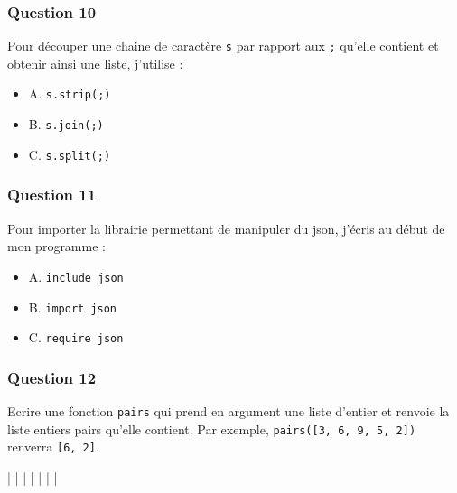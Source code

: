 \documentclass[
]{article}
\newenvironment{Shaded}{}{}
\newcommand{\OperatorTok}[1]{\textcolor[rgb]{0.40,0.40,0.40}{#1}}
\providecommand{\tightlist}{%
  \setlength{\itemsep}{0pt}\setlength{\parskip}{0pt}}
\begin{document}
\hypertarget{question-10}{%
\subsubsection{Question 10}\label{question-10}}

Pour découper une chaine de caractère \texttt{s} par rapport aux
\texttt{;} qu'elle contient et obtenir ainsi une liste, j'utilise :

\begin{itemize}
\tightlist
\item
  A. \texttt{s.strip(\textquotesingle{};\textquotesingle{})}
\item
  B. \texttt{s.join(\textquotesingle{};\textquotesingle{})}
\item
  C. \texttt{s.split(\textquotesingle{};\textquotesingle{})}
\end{itemize}

\hypertarget{question-11}{%
\subsubsection{Question 11}\label{question-11}}

Pour importer la librairie permettant de manipuler du json, j'écris au
début de mon programme :

\begin{itemize}
\tightlist
\item
  A. \texttt{include\ json}
\item
  B. \texttt{import\ json}
\item
  C. \texttt{require\ json}
\end{itemize}

\hypertarget{question-12}{%
\subsubsection{Question 12}\label{question-12}}

Ecrire une fonction \texttt{pairs} qui prend en argument une liste
d'entier et renvoie la liste entiers pairs qu'elle contient. Par
exemple, \texttt{pairs({[}3,\ 6,\ 9,\ 5,\ 2{]})} renverra
\texttt{{[}6,\ 2{]}}.

\begin{Shaded}
\begin{Highlighting}[]
\OperatorTok{|}
\OperatorTok{|}
\OperatorTok{|}
\OperatorTok{|}
\OperatorTok{|}
\OperatorTok{|}
\OperatorTok{|}
\end{Highlighting}
\end{Shaded}
\end{document}
